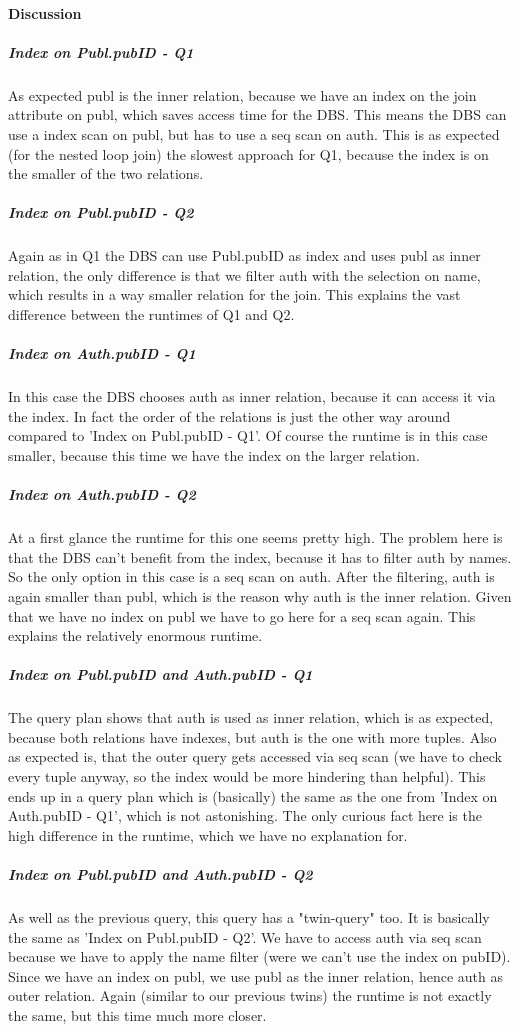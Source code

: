 \documentclass[11pt]{scrartcl}
\begin{document}
\paragraph{Discussion}
\subparagraph{Index on Publ.pubID - Q1}
As expected publ is the inner relation, because we have an index on the join attribute on publ, which saves access time for the DBS. This means the DBS can use a index scan on publ, but has to use a seq scan on auth.
This is as expected (for the nested loop join) the slowest approach for Q1, because the index is on the smaller of the two relations.\\
\subparagraph{Index on Publ.pubID - Q2}
Again as in Q1 the DBS can use Publ.pubID as index and uses publ as inner relation, the only difference is that we filter auth with the selection on name, which results in a way smaller relation for the join. This explains the vast difference between the runtimes of Q1 and Q2.\\
\subparagraph{Index on Auth.pubID - Q1}
In this case the DBS chooses auth as inner relation, because it can access it via the index. In fact the order of the relations is just the other way around compared to 'Index on Publ.pubID - Q1'. Of course the runtime is in this case smaller, because this time we have the index on the larger relation.\\
\subparagraph{Index on Auth.pubID - Q2}
At a first glance the runtime for this one seems pretty high. The problem here is that the DBS can't benefit from the index, because it has to filter auth by names. So the only option in this case is a seq scan on auth. After the filtering, auth is again smaller than publ, which is the reason why auth is the inner relation. Given that we have no index on publ we have to go here for a seq scan again. This explains the relatively enormous runtime.\\
\subparagraph{Index on Publ.pubID and Auth.pubID - Q1}
The query plan shows that auth is used as inner relation, which is as expected, because both relations have indexes, but auth is the one with more tuples. Also as expected is, that the outer query gets accessed via seq scan (we have to check every tuple anyway, so the index would be more hindering than helpful). This ends up in a query plan which is (basically) the same as the one from 'Index on Auth.pubID - Q1', which is not astonishing. The only curious fact here is the high difference in the runtime, which we have no explanation for.\\
\subparagraph{Index on Publ.pubID and Auth.pubID - Q2}
As well as the previous query, this query has a "twin-query" too. It is basically the same as 'Index on Publ.pubID - Q2'. We have to access auth via seq scan because we have to apply the name filter (were we can't use the index on pubID). Since we have an index on publ, we use publ as the inner relation, hence auth as outer relation. Again (similar to our previous twins) the runtime is not exactly the same, but this time much more closer.
\end{document}

